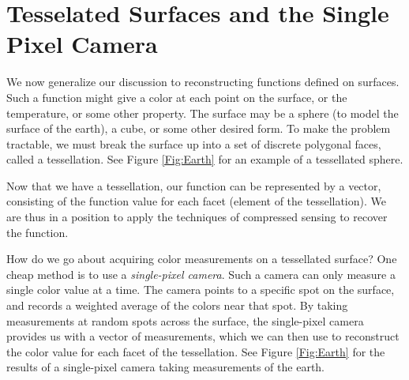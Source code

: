\section*{Tesselated Surfaces and the Single Pixel Camera}
We now generalize our discussion to reconstructing functions defined on surfaces.
Such a function might give a color at each point on the surface, or the temperature, or some other property.
The surface may be a sphere (to model the surface of the earth), a cube, or some other desired form.
To make the problem tractable, we must break the surface up into a set of discrete polygonal faces, called a tessellation.
See Figure \ref{Fig:Earth} for an example of a tessellated sphere.

Now that we have a tessellation, our function can be represented by a vector, consisting of the function value for each facet (element of the tessellation).
We are thus in a position to apply the techniques of compressed sensing to recover the function. 

How do we go about acquiring color measurements on a tessellated surface?
One cheap method is to use a \emph{single-pixel camera}.
Such a camera can only measure a single color value at a time.
The camera points to a specific spot on the surface, and records a weighted average of the colors near that spot.
By taking measurements at random spots across the surface, the single-pixel camera provides us with a vector of measurements, which we can then use to reconstruct the color value for each facet of the tessellation.
See Figure \ref{Fig:Earth} for the results of a single-pixel camera taking measurements of the earth.

